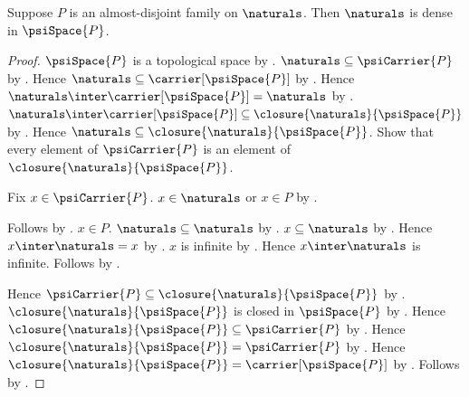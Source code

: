 \begin{theorem}\label{psi_naturals_dense}
    Suppose $P$ is an almost-disjoint family on $\naturals$.
    Then $\naturals$ is dense in $\psiSpace{P}$.
\end{theorem}
\begin{proof}
    $\psiSpace{P}$ is a topological space
        by .
    $\naturals\subseteq\psiCarrier{P}$
        by .
    Hence $\naturals\subseteq\carrier[\psiSpace{P}]$
        by .
    Hence $\naturals\inter\carrier[\psiSpace{P}]=\naturals$
        by .
    $\naturals\inter\carrier[\psiSpace{P}]\subseteq
        \closure{\naturals}{\psiSpace{P}}$
        by .
    Hence $\naturals\subseteq\closure{\naturals}{\psiSpace{P}}$.
    Show that every element of $\psiCarrier{P}$ is an element of
        $\closure{\naturals}{\psiSpace{P}}$.
    \begin{subproof}
        Fix $x\in\psiCarrier{P}$.
        $x\in\naturals$ or $x\in P$ by .
        \begin{byCase}
                Follows by .
                $x\in P$.
                $\naturals\subseteq\naturals$ by .
                $x\subseteq\naturals$ by
                    .
                Hence $x\inter\naturals=x$
                    by .
                $x$ is infinite by
                    .
                Hence $x\inter\naturals$ is infinite.
                Follows by .
        \end{byCase}
    \end{subproof}
    Hence $\psiCarrier{P}\subseteq
        \closure{\naturals}{\psiSpace{P}}$ by .
    $\closure{\naturals}{\psiSpace{P}}$ is closed in $\psiSpace{P}$
        by .
    Hence $\closure{\naturals}{\psiSpace{P}}\subseteq\psiCarrier{P}$
        by .
    Hence $\closure{\naturals}{\psiSpace{P}}=\psiCarrier{P}$
        by .
    Hence $\closure{\naturals}{\psiSpace{P}}=
        \carrier[\psiSpace{P}]$ by .
    Follows by .
\end{proof}

